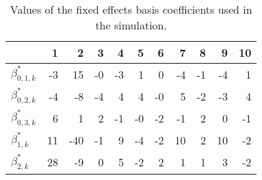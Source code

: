 \begin{table}[ht]
\centering
\begin{tabular}{lrrrrrrrrrr}
  \toprule
 & {\bfseries 1} & {\bfseries 2} & {\bfseries 3} & {\bfseries 4} & {\bfseries 5} & {\bfseries 6} & {\bfseries 7} & {\bfseries 8} & {\bfseries 9} & {\bfseries 10} \\ 
  \midrule
$\beta_{0, 1, k}^*$ & -3 & 15 & -0 & -3 & 1 & 0 & -4 & -1 & -4 & 1 \\ 
  $\beta_{0, 2, k}^*$ & -4 & -8 & -4 & 4 & 4 & -0 & 5 & -2 & -3 & 4 \\ 
  $\beta_{0, 3, k}^*$ & 6 & 1 & 2 & -1 & -0 & -2 & -1 & 2 & 0 & -1 \\ 
  $\beta_{1, k}^* $ & 11 & -40 & -1 & 9 & -4 & -2 & 10 & 2 & 10 & -2 \\ 
  $\beta_{2, k}^* $ & 28 & -9 & 0 & 5 & -2 & 2 & 1 & 1 & 3 & -2 \\ 
   \bottomrule
\end{tabular}
\caption{Values of the fixed effects basis coefficients used in the simulation.} 
\label{tab:fixed-parameters}
\end{table}
